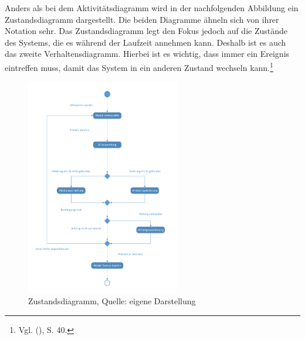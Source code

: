 \noindent
Anders als bei dem Aktivitätsdiagramm wird in der nachfolgenden Abbildung ein Zustandsdiagramm dargestellt. Die beiden Diagramme ähneln sich von ihrer Notation sehr. Das Zustandsdiagramm legt den Fokus jedoch auf die Zustände des Systems, die es während der Laufzeit annehmen kann. Deshalb ist es auch das zweite Verhaltensdiagramm. Hierbei ist es wichtig, dass immer ein Ereignis eintreffen muss, damit das System in ein anderen Zustand wechseln kann.\footnote{Vgl. \citeauthor{Balzert} (\citeyear{Balzert}), S. 40.}

\begin{figure}[h!]
\centering
\includegraphics[width=0.6\textwidth]{Abbildungen/Zustandsdiagramm.pdf}
	\caption[Zustandsdiagramm]{Zustandsdiagramm, Quelle: eigene Darstellung}
	\label{fig:Zustandsdiagramm}
\end{figure}

